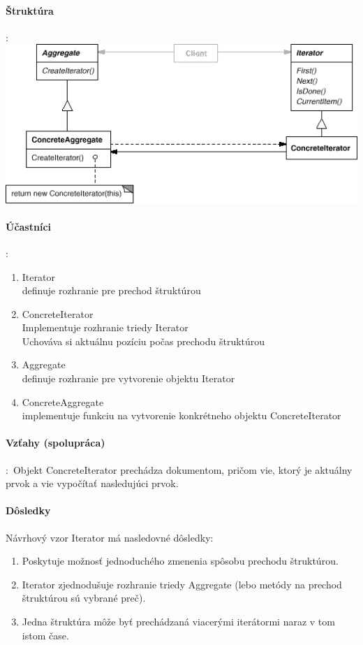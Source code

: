 			\paragraph{Štruktúra}:\\

				\includegraphics[width=.9\textwidth]{images/programovanie/iterator3}

			\paragraph{Účastníci}:\\
				\begin{enumerate}
					\item Iterator\\
						definuje rozhranie pre prechod štruktúrou
					\item ConcreteIterator\\
						Implementuje rozhranie triedy Iterator\\
						Uchováva si aktuálnu pozíciu počas prechodu štruktúrou
					\item Aggregate\\
						definuje rozhranie pre vytvorenie objektu Iterator
					\item ConcreteAggregate\\
					implementuje funkciu na vytvorenie konkrétneho objektu ConcreteIterator
				\end{enumerate}
			\paragraph{Vzťahy (spolupráca)}:\
				Objekt ConcreteIterator prechádza dokumentom, pričom vie, ktorý je aktuálny prvok a vie vypočítať nasledujúci prvok.
			\paragraph{Dôsledky}
				Návrhový vzor Iterator má nasledovné dôsledky:
				\begin{enumerate}
					\item Poskytuje možnosť jednoduchého zmenenia spôsobu prechodu štruktúrou.
					\item Iterator zjednodušuje rozhranie triedy Aggregate (lebo metódy na prechod štruktúrou sú vybrané preč).
					\item Jedna štruktúra môže byť prechádzaná viacerými iterátormi naraz v tom istom čase.
				\end{enumerate}
